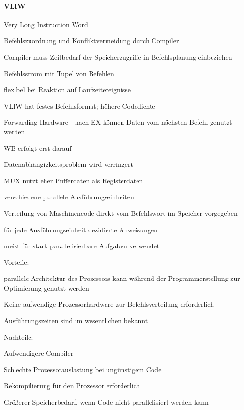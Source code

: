 \documentclass[10pt,landscape]{article}
\begin{document}
\begin{multicols}{3}
  \paragraph{VLIW} Very Long Instruction Word
  \begin{itemize*}
    \item Befehlszuordnung und Konfliktvermeidung durch Compiler
    \item Compiler muss Zeitbedarf der Speicherzugriffe in Befehlsplanung einbeziehen
    \item Befehlsstrom mit Tupel von Befehlen
    \item flexibel bei Reaktion auf Laufzeitereignisse
    \item VLIW hat festes Befehlsformat; höhere Codedichte
    \item Forwarding Hardware - nach EX können Daten vom nächsten Befehl genutzt werden
    \item WB erfolgt erst darauf
    \item Datenabhängigkeitsproblem wird verringert
    \item MUX nutzt eher Pufferdaten als Registerdaten
    \item verschiedene parallele Ausführungseinheiten
    \item Verteilung von Maschinencode direkt vom Befehlswort im Speicher vorgegeben
    \item für jede Ausführungseinheit dezidierte Anweisungen
    \item meist für stark parallelisierbare Aufgaben verwendet
    \item Vorteile:
    \begin{itemize*}
      \item parallele Architektur des Prozessors kann während der Programmerstellung zur Optimierung genutzt werden
      \item Keine aufwendige Prozessorhardware zur Befehlsverteilung erforderlich
      \item Ausführungszeiten sind im wesentlichen bekannt
    \end{itemize*}
    \item Nachteile:
    \begin{itemize*}
      \item Aufwendigere Compiler
      \item Schlechte Prozessorauslastung bei ungünstigem Code
      \item Rekompilierung für den Prozessor erforderlich
      \item Größerer Speicherbedarf, wenn Code nicht parallelisiert werden kann
    \end{itemize*}
  \end{itemize*}
  

\end{multicols}
\end{document}
